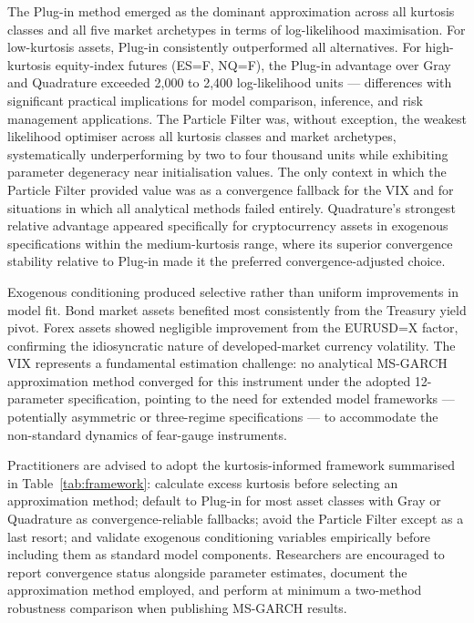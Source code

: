 \documentclass[12pt, a4paper]{article}
\begin{document}
The Plug-in method emerged as the dominant approximation across all kurtosis classes and all five market archetypes in terms of log-likelihood maximisation. For low-kurtosis assets, Plug-in consistently outperformed all alternatives. For high-kurtosis equity-index futures (ES=F, NQ=F), the Plug-in advantage over Gray and Quadrature exceeded 2{,}000 to 2{,}400 log-likelihood units — differences with significant practical implications for model comparison, inference, and risk management applications. The Particle Filter was, without exception, the weakest likelihood optimiser across all kurtosis classes and market archetypes, systematically underperforming by two to four thousand units while exhibiting parameter degeneracy near initialisation values. The only context in which the Particle Filter provided value was as a convergence fallback for the VIX and for situations in which all analytical methods failed entirely. Quadrature's strongest relative advantage appeared specifically for cryptocurrency assets in exogenous specifications within the medium-kurtosis range, where its superior convergence stability relative to Plug-in made it the preferred convergence-adjusted choice.

Exogenous conditioning produced selective rather than uniform improvements in model fit. Bond market assets benefited most consistently from the Treasury yield pivot. Forex assets showed negligible improvement from the EURUSD=X factor, confirming the idiosyncratic nature of developed-market currency volatility. The VIX represents a fundamental estimation challenge: no analytical MS-GARCH approximation method converged for this instrument under the adopted 12-parameter specification, pointing to the need for extended model frameworks — potentially asymmetric or three-regime specifications — to accommodate the non-standard dynamics of fear-gauge instruments.

Practitioners are advised to adopt the kurtosis-informed framework summarised in Table~\ref{tab:framework}: calculate excess kurtosis before selecting an approximation method; default to Plug-in for most asset classes with Gray or Quadrature as convergence-reliable fallbacks; avoid the Particle Filter except as a last resort; and validate exogenous conditioning variables empirically before including them as standard model components. Researchers are encouraged to report convergence status alongside parameter estimates, document the approximation method employed, and perform at minimum a two-method robustness comparison when publishing MS-GARCH results.
\end{document}
